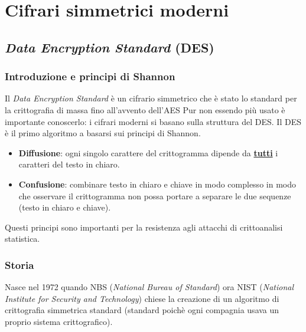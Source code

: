 \part{Cifrari simmetrici moderni}
\chapter{\emph{Data Encryption Standard} (DES)}
\section{Introduzione e principi di Shannon}
Il \emph{Data Encryption Standard} è un cifrario simmetrico che è stato lo standard per la crittografia di massa fino all'avvento dell'AES Pur non essendo più usato è importante conoscerlo: i cifrari moderni si basano sulla struttura del DES. Il DES è il primo algoritmo a basarsi sui principi di Shannon.
\begin{itemize}
    \item \textbf{Diffusione}: ogni singolo carattere del crittogramma dipende da \underline{\textbf{tutti}} i caratteri del testo in chiaro.
    \item \textbf{Confusione}: combinare testo in chiaro e chiave in modo complesso in modo che osservare il crittogramma non possa portare a separare le due sequenze (testo in chiaro e chiave).
\end{itemize}
Questi principi sono importanti per la resistenza agli attacchi di crittoanalisi statistica.

\section{Storia}
Nasce nel 1972 quando NBS (\textit{National Bureau of Standard}) ora NIST (\textit{National Institute for Security and Technology}) chiese la creazione di un algoritmo di crittografia simmetrica standard (standard poichè ogni compagnia usava un proprio sistema crittografico). 
